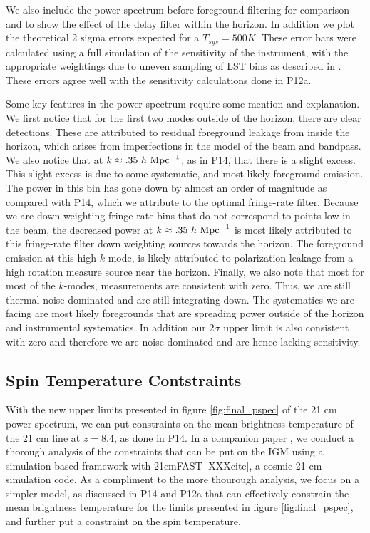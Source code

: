 \documentclass[twocolumn,numberedappendix]{emulateapj} \shorttitle{PSA64}
\begin{document}
We also include the power spectrum before foreground filtering for comparison
and to show the effect of the delay filter within the horizon. In addition we
plot the theoretical 2 sigma errors expected for a $T_{sys} = 500 K$. These
error bars were calculated using a full simulation of the sensitivity of the
instrument, with the appropriate weightings due to uneven sampling of LST bins
as described in \cite{pober_et_al2014}. These errors agree well with the
sensitivity calculations done in P12a.

Some key features in the power spectrum require some mention and explanation. We
first notice that for the first two modes outside of the horizon, there are
clear detections. These are attributed to residual foreground leakage from
inside the horizon, which arises from imperfections in the model of the beam and
bandpass. We also notice that at $k\approx{.35}\ h\ {\rm Mpc}^{-1}$, as in P14,
that there is a slight excess. This slight excess is
due to some systematic, and most likely foreground emission. The power in this
bin has gone down by almost an order of magnitude as compared with P14,
which we attribute to the optimal fringe-rate filter.
Because we are down weighting fringe-rate bins that do not correspond to points
low in the beam, the decreased power at $k\approx{.35}\ h\ {\rm Mpc}^{-1}$ is
most likely attributed to this fringe-rate filter down weighting sources towards
the horizon. The foreground emission at this high $k$-mode, is likely attributed
to polarization leakage from a high rotation measure source near the horizon.
Finally, we also note that most for most of the $k$-modes, measurements are
consistent with zero. Thus, we are still thermal noise dominated and are still
integrating down. The systematics we are facing are most likely foregrounds that
are spreading power outside of the horizon and instrumental systematics. In
addition our $2\sigma$ upper limit is also consistent with zero and therefore we
are noise dominated and are hence lacking sensitivity.

\subsection{Spin Temperature Contstraints}
With the new upper limits presented in figure \ref{fig:final_pspec} of the 21 cm
power spectrum,  we can put constraints on the mean brightness
temperature of the 21 cm line at $z=8.4$, as done in P14.
In a companion
paper \citep{pober_et_al2015}, we conduct a thorough analysis of the
constraints that can be put on the IGM using a simulation-based framework with 21cmFAST
[XXXcite], a cosmic 21 cm simulation code. As a compliment to the more thourough
analysis, we focus on a simpler model, as discussed in P14 and P12a that can effectively
constrain the mean brightness temperature for the limits presented in
figure \ref{fig:final_pspec}, and further put a constraint on the spin temperature.
\end{document}
